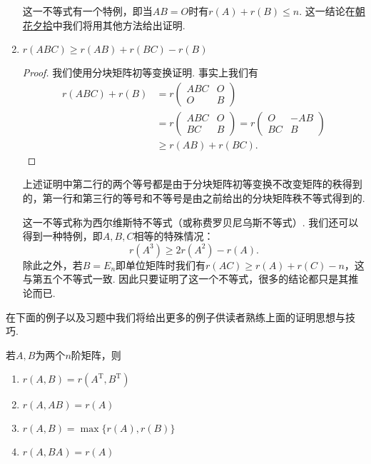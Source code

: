 \begin{enumerate}
          这一不等式有一个特例，即当$AB=O$时有$r(A)+r(B)\leqslant n$. 这一结论在\hyperref[chap:朝花夕拾]{朝花夕拾}中我们将用其他方法给出证明.

    \item $r(ABC) \geqslant r(AB)+r(BC)-r(B)$

          \begin{proof}
              我们使用分块矩阵初等变换证明. 事实上我们有
              \begin{align*}
                r(ABC)+r(B)&=r\begin{pmatrix}
                    ABC & O \\ O & B
                \end{pmatrix} \\
                &=r\begin{pmatrix}
                    ABC & O \\ BC & B
                \end{pmatrix}=r\begin{pmatrix}
                    O & -AB \\ BC & B
                \end{pmatrix}\\
                &\geqslant r(AB)+r(BC).
              \end{align*}
          \end{proof}

          上述证明中第二行的两个等号都是由于分块矩阵初等变换不改变矩阵的秩得到的，第一行和第三行的等号和不等号是由之前给出的分块矩阵秩不等式得到的.

          这一不等式称为西尔维斯特不等式（或称费罗贝尼乌斯不等式）. 我们还可以得到一种特例，即$A,B,C$相等的特殊情况：
          \[r(A^3) \geqslant 2r(A^2)-r(A).\]
          除此之外，若$B=E_n$即单位矩阵时我们有$r(AC) \geqslant r(A)+r(C)-n$，这与第五个不等式一致. 因此只要证明了这一个不等式，很多的结论都只是其推论而已.
\end{enumerate}

在下面的例子以及习题中我们将给出更多的例子供读者熟练上面的证明思想与技巧.
\begin{example}
    若$A,B$为两个$n$阶矩阵，则
    \begin{enumerate}[label=\Alph*.]
        \item $r(A,B)=r(A^\mathrm{T},B^\mathrm{T})$

        \item $r(A,AB)=r(A)$

        \item $r(A,B)=\max\{r(A), r(B)\}$

        \item $r(A,BA)=r(A)$
    \end{enumerate}
\end{example}

